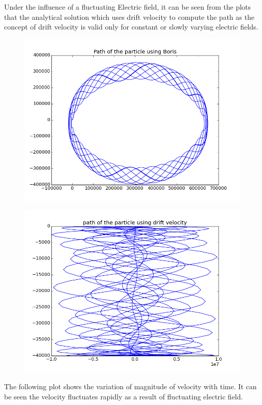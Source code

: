 \documentclass[11pt, a4paper]{article}
\begin{document}
Under the influence of a fluctuating Electric field, it can be seen from the plots that the analytical solution which uses drift velocity to compute the path as the concept of drift velocity is valid only for constant or slowly varying  electric fields.
\begin{figure}[H]
 \centering
 \includegraphics[width = \textwidth]{q2b_path.png}
\end{figure}
\begin{figure}[H]
 \centering
 \includegraphics[width = \textwidth]{q2b_exact.png}
\end{figure}
The following plot shows the variation of magnitude of velocity with time. It can be seen the velocity fluctuates rapidly as a result of fluctuating electric field.
\end{document}
